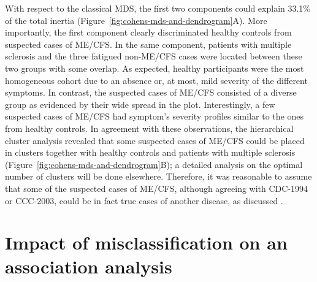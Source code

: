 With respect to the classical MDS, the first two components could explain 33.1\% of the total inertia (Figure~\ref{fig:cohens-mds-and-dendrogram}A). More importantly, the first component clearly discriminated healthy controls from suspected cases of ME/CFS. In the same component, patients with multiple sclerosis and the three fatigued non-ME/CFS cases  were located between these two groups with some overlap. As expected, healthy participants were the most homogeneous cohort due to an absence or, at most, mild severity of the different symptoms. In contrast, the suspected cases of ME/CFS consisted of a diverse group as evidenced by their wide spread in the plot. Interestingly, a few suspected cases of ME/CFS had symptom's severity profiles similar to the ones from healthy controls. In agreement with these observations, the hierarchical cluster analysis revealed that some suspected cases of ME/CFS could be placed in clusters together with healthy controls and patients with multiple sclerosis (Figure~\ref{fig:cohens-mds-and-dendrogram}B); a detailed analysis on the optimal number of clusters will be done elsewhere. Therefore, it was reasonable to assume that some of the suspected cases of ME/CFS, although agreeing with CDC-1994 or CCC-2003, could be in fact true cases of another disease, as discussed \citet{nacul2019HowHave}.

\section{Impact of misclassification on an association analysis}


